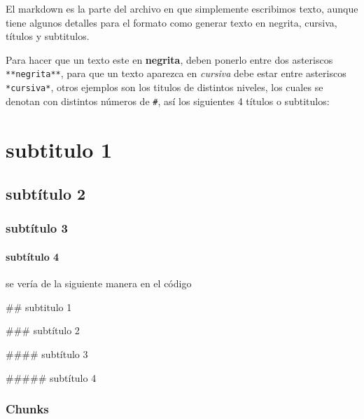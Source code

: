 \documentclass[]{book}
\newenvironment{Shaded}{\begin{snugshade}}{\end{snugshade}}
\newcommand{\NormalTok}[1]{#1}
\let\oldparagraph\paragraph
\renewcommand{\paragraph}[1]{\oldparagraph{#1}\mbox{}}
\begin{document}
El markdown es la parte del archivo en que simplemente escribimos texto,
aunque tiene algunos detalles para el formato como generar texto en
negrita, cursiva, títulos y subtitulos.

Para hacer que un texto este en \textbf{negrita}, deben ponerlo entre
dos asteriscos \texttt{**negrita**}, para que un texto aparezca en
\emph{cursiva} debe estar entre asteriscos \texttt{*cursiva*}, otros
ejemplos son los titulos de distintos niveles, los cuales se denotan con
distintos números de \texttt{\#}, así los siguientes 4 títulos o
subtitulos:

\hypertarget{subtitulo-1}{%
\section*{subtitulo 1}\label{subtitulo-1}}

\hypertarget{subtitulo-2}{%
\subsection*{subtítulo 2}\label{subtitulo-2}}

\hypertarget{subtitulo-3}{%
\subsubsection*{subtítulo 3}\label{subtitulo-3}}

\hypertarget{subtitulo-4}{%
\paragraph{subtítulo 4}\label{subtitulo-4}}

se vería de la siguiente manera en el código

\begin{Shaded}
\begin{Highlighting}[]
\NormalTok{## subtitulo 1}

\NormalTok{### subtítulo 2}

\NormalTok{#### subtítulo 3}

\NormalTok{##### subtítulo 4}
\end{Highlighting}
\end{Shaded}

\hypertarget{chunks}{%
\subsubsection{Chunks}\label{chunks}}
\end{document}
